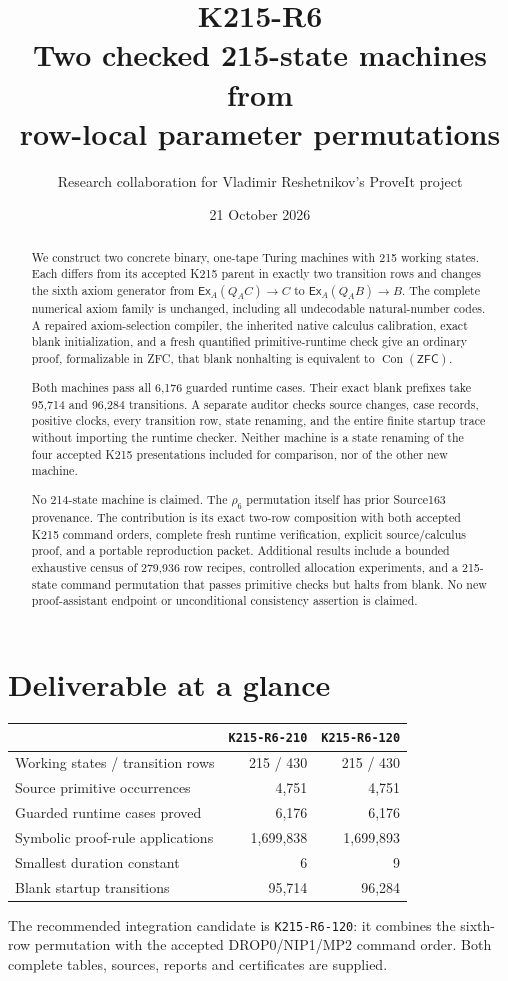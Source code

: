 \documentclass[11pt,a4paper]{article}
\title{\vspace{-12mm}\textbf{K215-R6}\\[3pt]
Two checked 215-state machines from\\
row-local parameter permutations}
\author{Research collaboration for Vladimir Reshetnikov's ProveIt project}
\date{21 October 2026}
\theoremstyle{remark}\newtheorem{remark}[theorem]{Remark}
\newcommand{\ZFC}{\mathsf{ZFC}}
\newcommand{\Con}{\operatorname{Con}}
\newcommand{\Ex}[2]{\mathsf{Ex}_{#1}(#2)}
\newcommand{\imp}{\mathbin{\to}}
\newcommand{\rhoa}{\texttt{K215-R6-210}}
\newcommand{\rhob}{\texttt{K215-R6-120}}
\begin{document}
\maketitle
\begin{abstract}
We construct two concrete binary, one-tape Turing machines with 215 working
states. Each differs from its accepted K215 parent in exactly two transition
rows and changes the sixth axiom generator from
$\Ex{A}{Q_A C}\imp C$ to $\Ex{A}{Q_A B}\imp B$.
The complete numerical axiom family is unchanged, including all undecodable
natural-number codes. A repaired axiom-selection compiler, the inherited native
calculus calibration, exact blank initialization, and a fresh quantified
primitive-runtime check give an ordinary proof, formalizable in ZFC, that
blank nonhalting is equivalent to $\Con(\ZFC)$.

Both machines pass all 6,176 guarded runtime cases. Their exact blank prefixes
take 95,714 and 96,284 transitions. A separate auditor checks source changes,
case records, positive clocks, every transition row, state renaming, and the
entire finite startup trace without importing the runtime checker.
Neither machine is a state renaming of the four accepted K215 presentations
included for comparison, nor of the other new machine.

No 214-state machine is claimed. The $\rho_6$ permutation itself has prior
Source163 provenance. The contribution is its exact two-row composition with
both accepted K215 command orders, complete fresh runtime verification,
explicit source/calculus proof, and a portable reproduction packet.
Additional results include a bounded exhaustive census of 279,936 row recipes,
controlled allocation experiments, and a 215-state command permutation that
passes primitive checks but halts from blank. No new proof-assistant endpoint
or unconditional consistency assertion is claimed.
\end{abstract}

\section*{Deliverable at a glance}
\begin{center}
\begin{tabular}{@{}lrr@{}}
\toprule
& \rhoa & \rhob\\
\midrule
Working states / transition rows & 215 / 430 & 215 / 430\\
Source primitive occurrences & 4,751 & 4,751\\
Guarded runtime cases proved & 6,176 & 6,176\\
Symbolic proof-rule applications & 1,699,838 & 1,699,893\\
Smallest duration constant & 6 & 9\\
Blank startup transitions & 95,714 & 96,284\\
\bottomrule
\end{tabular}
\end{center}
The recommended integration candidate is \rhob: it combines the sixth-row
permutation with the accepted DROP0/NIP1/MP2 command order. Both complete
tables, sources, reports and certificates are supplied.
\end{document}
